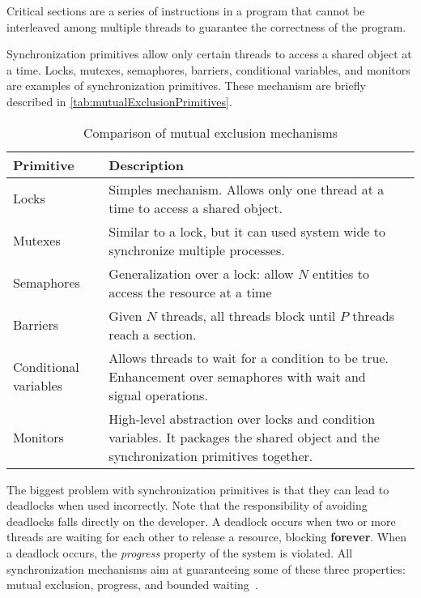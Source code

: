 \begin{tcolorbox}[colback=blue!5!white, colframe=blue!75!black, title=Critical Section]
    Critical sections are a series of instructions in a program that cannot
    be interleaved among multiple threads to guarantee the correctness of the program.
\end{tcolorbox}

Synchronization primitives allow
only certain threads to access a shared object at a time.
Locks, mutexes, semaphores, barriers, conditional variables, and monitors
are examples of synchronization primitives.
These mechanism are briefly described in \autoref{tab:mutualExclusionPrimitives}.

\begin{table}[!htp]
    \caption{Comparison of mutual exclusion mechanisms}
    \label{tab:mutualExclusionPrimitives}
    \centering
    \begin{tabularx}{\textwidth}{|l|X|X|}
        \hline
        \textbf{Primitive} & \textbf{Description}\\
        \hline
        Locks & 
        Simples mechanism. Allows only one thread at a time to access a shared object.\\
        \hline
        Mutexes & 
        Similar to a lock, but it can used system wide to synchronize multiple processes.\\
        \hline
        Semaphores & 
        Generalization over a lock: allow $N$ entities to access the resource at a time\\
        \hline
        Barriers &
        Given $N$ threads, all threads block until $P$ threads reach a section.\\
        \hline
        Conditional variables &
        Allows threads to wait for a condition to be true. Enhancement
        over semaphores with wait and signal operations.\\
        \hline
        Monitors &
        High-level abstraction over locks and condition variables. It packages
        the shared object and the synchronization primitives together.\\
        \hline
    \end{tabularx}
\end{table}

The biggest problem with synchronization primitives is that they can
lead to deadlocks when used incorrectly. Note that
the responsibility of avoiding deadlocks falls directly on the developer.
A deadlock occurs when two or more threads are waiting
for each other to release a resource, blocking \textbf{forever}.
When a deadlock occurs, the \textit{progress} property
of the system is violated. All synchronization mechanisms aim
at guaranteeing some of these three properties:
mutual exclusion, progress, and bounded waiting~\cite{csf2025synchronizationPrimitives}.


